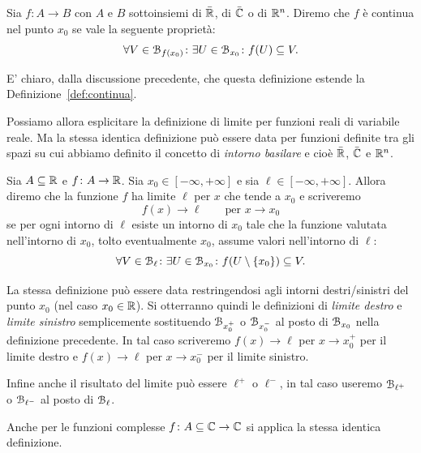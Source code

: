 \begin{definition}
  \label{def:continua_intorni}
  Sia $f\colon A\to B$ con $A$ e $B$ sottoinsiemi di $\bar {{\mathbb R}}$, di $\bar {{\mathbb C}}$ 
  o di ${\mathbb R}^n$. 
  Diremo che $f$ è continua nel punto $x_0$ se vale la seguente proprietà:
  \[
    \forall V \in \mathcal B_{f(x_0)} \colon \exists U \in \mathcal B_{x_0} \colon f(U) \subseteq V.
  \]

  E' chiaro, dalla discussione precedente, che questa definizione 
  estende la Definizione~\ref{def:continua}.
\end{definition}

Possiamo allora esplicitare la definizione di limite per funzioni reali 
di variabile reale. 
Ma la stessa identica definizione può essere data per funzioni definite 
tra gli spazi su cui abbiamo definito il concetto di \emph{intorno basilare}
e cioè $\bar {{\mathbb R}}$, $\bar {{\mathbb C}}$ e ${\mathbb R}^n$.

\begin{definition}
\mymark{***}
Sia $A\subseteq {\mathbb R}$ e $f\colon A \to {\mathbb R}$.
Sia $x_0\in [-\infty,+\infty]$
e sia $\ell \in [-\infty,+\infty]$.
Allora diremo che la funzione $f$ ha limite $\ell$ per $x$ che tende a $x_0$ 
e scriveremo%
\[
  f(x) \to \ell \qquad \text{per $x\to x_0$}
\]
se per ogni intorno di $\ell$ esiste un intorno di $x_0$ tale che
la funzione valutata nell'intorno di $x_0$, tolto eventualmente $x_0$,
assume valori
nell'intorno di $\ell$:
\begin{equation}\label{eq:def_limite}
  \forall V \in \mathcal B_\ell \colon \exists U \in \mathcal B_{x_0} \colon f(U\setminus{\left\{ x_0 \right\}}) \subseteq V.
\end{equation}

La stessa definizione può essere data restringendosi agli intorni destri/sinistri del punto $x_0$ (nel caso $x_0 \in {\mathbb R}$). Si otterranno quindi le definizioni
di \emph{limite destro} e \emph{limite sinistro}
%
semplicemente sostituendo $\mathcal B_{x_0^+}$ o $\mathcal B_{x_0^-}$ al posto di 
$\mathcal B_{x_0}$ nella definizione
precedente. 
In tal caso scriveremo $f(x)\to \ell$ per $x\to x_0^+$ per il limite 
destro e $f(x)\to \ell$ per $x\to x_0^-$ per il limite sinistro.

Infine anche il risultato del limite può essere $\ell^+$ o $\ell^-$, 
in tal caso useremo $\mathcal B_{\ell^+}$ o $\mathcal B_{\ell^-}$ 
al posto di $\mathcal B_{\ell}$.

Anche per le funzioni complesse $f\colon A\subseteq {\mathbb C} \to {\mathbb C}$ 
si applica la stessa identica definizione.
\end{definition}
  
